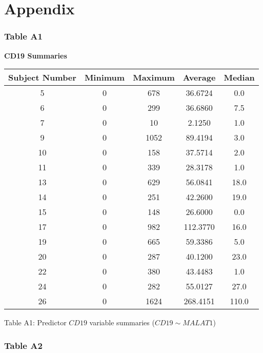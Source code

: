 \documentclass[12pt,]{article}
\title{}
\author{}
\date{}
\begin{document}
\hypertarget{appendix}{%
\section{Appendix}\label{appendix}}

\hypertarget{table-a1}{%
\subsubsection{Table A1}\label{table-a1}}

\begin{center}

\textbf{\large{CD19 Summaries}}

\begin{tabular}{|c|c|c|c|c|}
\hline 
Subject Number & Minimum & Maximum & Average & Median \\ 
\hline
\hline
5 &  0 & 678 & 36.6724 & 0.0 \\ 
\hline  
6 &  0 & 299 & 36.6860 & 7.5 \\ 
\hline  
7 &  0 & 10 & 2.1250 & 1.0 \\ 
\hline  
9 &  0 & 1052 & 89.4194 & 3.0 \\ 
\hline  
10 & 0 & 158 & 37.5714 & 2.0 \\ 
\hline   
11 & 0 & 339 & 28.3178 & 1.0 \\ 
\hline   
13 & 0 & 629 & 56.0841 & 18.0 \\ 
\hline   
14 & 0 & 251 & 42.2600 & 19.0 \\ 
\hline   
15 & 0 & 148 & 26.6000 & 0.0 \\ 
\hline   
17 & 0 & 982 & 112.3770 & 16.0 \\ 
\hline   
19 & 0 & 665 & 59.3386 & 5.0 \\ 
\hline   
20 & 0 & 287 & 40.1200 & 23.0 \\ 
\hline   
22 & 0 & 380 & 43.4483 & 1.0 \\ 
\hline   
24 & 0 & 282 & 55.0127 & 27.0 \\ 
\hline  
26 & 0 & 1624 & 268.4151 & 110.0 \\  
\hline
\end{tabular}

\vspace{5pt}

Table A1: Predictor $CD19$ variable summaries ($CD19 \sim MALAT1$)
\end{center}

\newpage

\hypertarget{table-a2}{%
\subsubsection{Table A2}\label{table-a2}}
\end{document}
